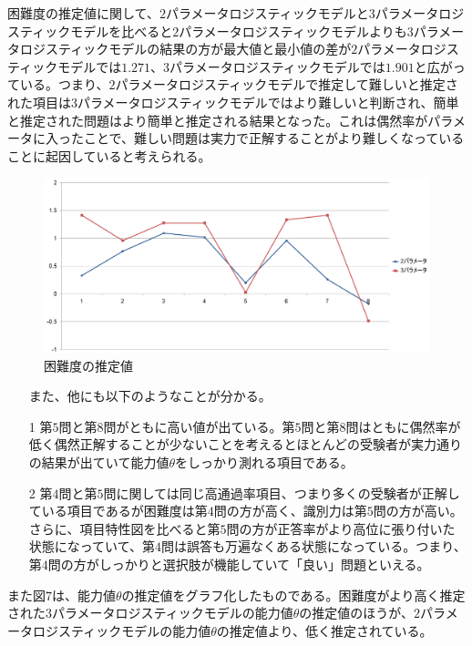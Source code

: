 \documentclass[12pt]{jarticle}
\numberwithin{equation}{subsection}
\begin{document}
困難度の推定値に関して、$2$パラメータロジスティックモデルと$3$パラメータロジスティックモデルを比べると$2$パラメータロジスティックモデルよりも$3$パラメータロジスティックモデルの結果の方が最大値と最小値の差が$2$パラメータロジスティックモデルでは$1.271$、$3$パラメータロジスティックモデルでは$1.901$と広がっている。つまり、$2$パラメータロジスティックモデルで推定して難しいと推定された項目は$3$パラメータロジスティックモデルではより難しいと判断され、簡単と推定された問題はより簡単と推定される結果となった。これは偶然率がパラメータに入ったことで、難しい問題は実力で正解することがより難しくなっていることに起因していると考えられる。
\vspace{4cm}
\begin{figure}[H]
  \centering
  \includegraphics[bb = 1000 100 1 1,scale = 0.3]{maxmin.png}
  \vspace{1cm}
  \caption{困難度の推定値}
\end{figure}
\begin{itemize}
  \item[]
  \item[] また、他にも以下のようなことが分かる。
  \item[1] 第$5$問と第$8$問がともに高い値が出ている。第$5$問と第$8$問はともに偶然率が低く偶然正解することが少ないことを考えるとほとんどの受験者が実力通りの結果が出ていて能力値$\theta$をしっかり測れる項目である。
  \item[2] 第$4$問と第$5$問に関しては同じ高通過率項目、つまり多くの受験者が正解している項目であるが困難度は第$4$問の方が高く、識別力は第$5$問の方が高い。さらに、項目特性図を比べると第$5$問の方が正答率がより高位に張り付いた状態になっていて、第$4$問は誤答も万遍なくある状態になっている。つまり、第$4$問の方がしっかりと選択肢が機能していて「良い」問題といえる。
  \item[]
\end{itemize}
また図$7$は、能力値$\theta$の推定値をグラフ化したものである。困難度がより高く推定された$3$パラメータロジスティックモデルの能力値$\theta$の推定値のほうが、$2$パラメータロジスティックモデルの能力値$\theta$の推定値より、低く推定されている。
\end{document}

